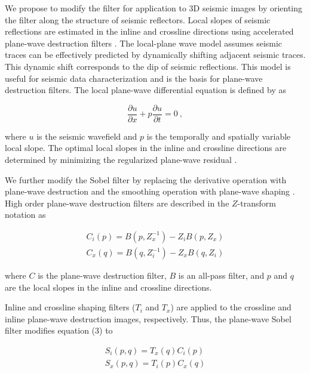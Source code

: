 We propose to modify the filter for application to 3D seismic images by orienting the filter along the structure of seismic reflectors.
Local slopes of seismic reflections are estimated in the inline and crossline directions using accelerated plane-wave destruction filters \cite[]{apwd}.
The local-plane	wave model assumes seismic traces can be effectively predicted by dynamically shifting adjacent seismic traces.
This dynamic shift corresponds to the dip of seismic reflections.
This model is useful for seismic data characterization and is the basis for plane-wave destruction filters.
The local plane-wave differential equation is defined by \cite{claerbout} as

\begin{equation}
\frac{\partial u}{\partial x}+p\frac{\partial u}{\partial t} = 0 \ ,
\end{equation}

where $u$ is the seismic wavefield and $p$ is the temporally and spatially variable local slope.
The optimal local slopes in the inline	and crossline directions are determined	by minimizing the regularized plane-wave residual \cite[]{fomel02}.

We further modify the Sobel filter by replacing the derivative operation with plane-wave destruction \cite[]{fomel02} and the smoothing operation with plane-wave shaping \cite[]{fomel07,swindeman}.
High order plane-wave destruction filters are described in the $Z$-transform notation as

\begin{equation}
\begin{array}{l}
C_i(p)=B(p,Z_x^{-1})-Z_iB(p,Z_x)\\
C_x(q)=B(q,Z_i^{-1})-Z_xB(q,Z_i)
\end{array}
\end{equation}

where $C$ is the plane-wave destruction filter, $B$ is an all-pass filter, and $p$ and $q$ are the local slopes in the inline and crossline directions.

Inline and crossline shaping filters ($T_i$ and $T_x$) are applied to the crossline and inline plane-wave destruction images, respectively.
Thus, the plane-wave Sobel filter modifies equation (3) to

\begin{equation}
\begin{array}{l}
S_i(p,q)=T_x(q)C_i(p)\\
S_x(p,q)=T_i(p)C_x(q)
\end{array}
\end{equation}

